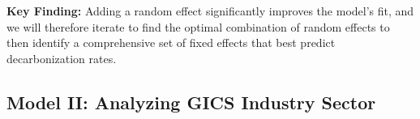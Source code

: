 \textbf{Key Finding:} Adding a random effect significantly improves the model's fit, and we will therefore iterate to find the optimal combination of random effects to then identify a comprehensive set of fixed effects that best predict decarbonization rates. 








\subsection{Model II: Analyzing GICS Industry Sector}




